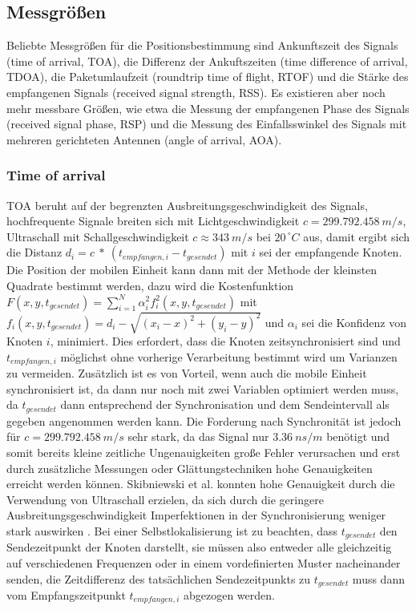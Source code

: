 \subsection{Messgrößen}
Beliebte Messgrößen für die Positionsbestimmung sind Ankunftszeit des Signals (time of arrival, TOA), die Differenz der Ankuftszeiten (time difference of arrival, TDOA), die Paketumlaufzeit (roundtrip time of flight, RTOF) und die Stärke des empfangenen Signals (received signal strength, RSS). Es existieren aber noch mehr messbare Größen, wie etwa die Messung der empfangenen Phase des Signals (received signal phase, RSP) und die Messung des Einfallsswinkel des Signals mit mehreren gerichteten Antennen (angle of arrival, AOA). \\

\subsubsection{Time of arrival}
TOA beruht auf der begrenzten Ausbreitungsgeschwindigkeit des Signals, hochfrequente Signale breiten sich mit Lichtgeschwindigkeit $c = 299.792.458\ m/s$, Ultraschall mit Schallgeschwindigkeit $c \approx 343\ m/s$ bei $20^{\ \circ}C$ aus, damit ergibt sich die Distanz $d_i = c\ *\ (t_{empfangen,i} - t_{gesendet})$ mit $i$ sei der empfangende Knoten. Die Position der mobilen Einheit kann dann mit der Methode der kleinsten Quadrate bestimmt werden, dazu wird die Kostenfunktion $F(x,y,t_{gesendet}) = \sum_{i=1}^{N} {\alpha}^2_i f^2_i(x,y,t_{gesendet})$ mit $f_i(x,y,t_{gesendet}) = d_i - \sqrt{(x_i - x)^2 + (y_i - y)^2}$ und ${\alpha}_i$ sei die Konfidenz von Knoten $i$, minimiert. Dies erfordert, dass die Knoten zeitsynchronisiert sind und $t_{empfangen,i}$ möglichst ohne vorherige Verarbeitung bestimmt wird um Varianzen zu vermeiden. Zusätzlich ist es von Vorteil, wenn auch die mobile Einheit synchronisiert ist, da dann nur noch mit zwei Variablen optimiert werden muss, da $t_{gesendet}$ dann entsprechend der Synchronisation und dem Sendeintervall als gegeben angenommen werden kann. Die Forderung nach Synchronität ist jedoch für $c = 299.792.458\ m/s$ sehr stark, da das Signal nur $3.36\ ns/m$ benötigt und somit bereits kleine zeitliche Ungenauigkeiten große Fehler verursachen und erst durch zusätzliche Messungen oder Glättungstechniken hohe Genauigkeiten erreicht werden können. Skibniewski et al. konnten hohe Genauigkeit durch die Verwendung von Ultraschall erzielen, da sich durch die geringere Ausbreitungsgeschwindigkeit Imperfektionen in der Synchronisierung weniger stark auswirken \cite{skibniewski2009simulation}. 
Bei einer Selbstlokalisierung ist zu beachten, dass $t_{gesendet}$ den Sendezeitpunkt der Knoten darstellt, sie müssen also entweder alle gleichzeitig auf verschiedenen Frequenzen oder in einem vordefinierten Muster nacheinander senden, die Zeitdifferenz des tatsächlichen Sendezeitpunkts zu $t_{gesendet}$ muss dann vom Empfangszeitpunkt $t_{empfangen,i}$ abgezogen werden. \\

